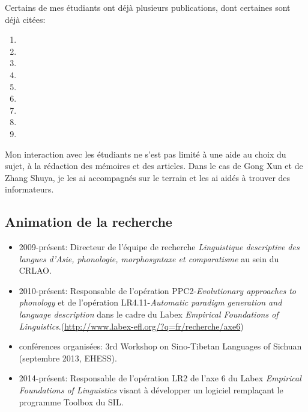 \documentclass[oldfontcommands,oneside,a4paper,11pt]{article}
\begin{document}
Certains de mes étudiants ont déjà plusieurs publications, dont certaines sont déjà citées:

\begin{enumerate}
  \item {}
  \item {}
  \item {}
  \item {}
    \item {}
    \item {}
 \item  {}
 \item  {}
 \item {} 
\end{enumerate}

Mon interaction avec les étudiants ne s'est pas limité à une aide au choix du sujet, à la rédaction des mémoires et des articles. Dans le cas de Gong Xun et de Zhang Shuya, je les ai accompagnés sur le terrain et les ai aidés à trouver des informateurs.

\subsection{Animation de la recherche}
\begin{itemize}
\item 2009-présent: Directeur de l'équipe de recherche \textit{Linguistique descriptive des langues d’Asie, phonologie, morphosyntaxe et comparatisme} au sein du CRLAO.
\item 2010-présent: Responsable de l'opération PPC2-\textit{Evolutionary approaches to phonology} et de l'opération LR4.11-\textit{Automatic paradigm generation and language description} dans le cadre du Labex \textit{Empirical Foundations of Linguistics}.(\url{http://www.labex-efl.org/?q=fr/recherche/axe6})
\item conférences organisées:  3rd Workshop on Sino-Tibetan Languages of Sichuan (septembre 2013, EHESS).
\item  2014-présent: Responsable de l'opération LR2 de l'axe 6 du Labex \textit{Empirical Foundations of Linguistics} visant à développer un logiciel remplaçant le programme Toolbox du SIL.
\end{itemize}
\end{document}
